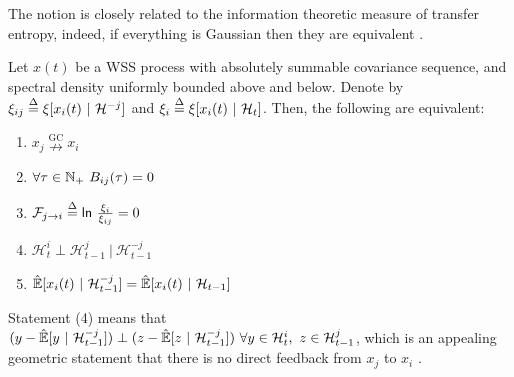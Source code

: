 \documentclass[12pt]{article}
\def\ngc{\overset{\text{GC}}{\nrightarrow}}  %
\def\H{\mathcal{H}}  %
\newcommand{\linE}[2]{\hat{\E}[#1\ |\ #2]}  %
\newcommand{\linEerr}[2]{\xi[#1\ |\ #2]}  %
\begin{document}
The notion is closely related to the information theoretic measure of
transfer entropy, indeed, if everything is Gaussian then they are
equivalent \cite{barnett2009granger}.

\begin{theorem}
  \label{thm:granger_causality_equivalences}
  Let $x(t)$ be a WSS process with absolutely summable covariance
  sequence, and spectral density uniformly bounded above and below.  Denote by
  $\xi_{ij} \defeq \linEerr{x_i(t)}{\H^{-j}}$ and
  $\xi_i \defeq \linEerr{x_i(t)}{\H_t}$.  Then, the following are equivalent:

  \begin{enumerate}
    \item{$x_j \ngc x_i$}
    \item{$\forall \tau \in \N_+\ B_{ij}(\tau) = 0$}
    \item{$\mathcal{F}_{j \rightarrow i} \overset{\Delta}{=} \mathsf{ln\ }\frac{\xi_i}{\xi_{ij}} = 0$}
    \item{$\H_t^{i} \perp \H_{t - 1}^{j}\ |\ \H_{t - 1}^{-j}$}
    \item{$\linE{x_i(t)}{\H_{t - 1}^{-j}} = \linE{x_i(t)}{\H_{t - 1}}$}
  \end{enumerate}
\end{theorem}

Statement (4) means that
$(y - \linE{y}{\H_{t - 1}^{-j}}) \perp (z - \linE{z}{\H_{t -
    1}^{-j}})\ \forall y \in \H_t^i,\ z \in \H_{t - 1}^j$, which is an
appealing geometric statement that there is no direct feedback from
$x_j$ to $x_i$ \cite{lindquist}.
\end{document}

